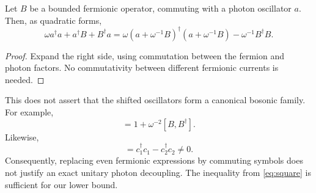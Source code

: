 \begin{lemma}
\label{lem:square}
Let \(B\) be a bounded fermionic operator, commuting with a photon
oscillator \(a\). Then, as quadratic forms,
\begin{equation}
\omega a^\dagger a+a^\dagger B+B^\dagger a
=
\omega\left(a+\omega^{-1}B\right)^\dagger
\left(a+\omega^{-1}B\right)
-\omega^{-1}B^\dagger B.
\label{eq:square}
\end{equation}
\end{lemma}
\begin{proof}
Expand the right side, using commutation between the fermion and photon
factors. No commutativity between different fermionic currents is needed.
\end{proof}
This does not assert that the shifted oscillators form a canonical bosonic
family. For example,
\begin{equation}
[a+\omega^{-1}B,a^\dagger+\omega^{-1}B^\dagger]
=1+\omega^{-2}[B,B^\dagger].
\end{equation}
Likewise,
\begin{equation}
[c_1^\dagger c_2,c_2^\dagger c_1]
=c_1^\dagger c_1-c_2^\dagger c_2\ne0.
\end{equation}
Consequently, replacing even fermionic expressions by commuting symbols
does not justify an exact unitary photon decoupling. The inequality from
\eqref{eq:square} is sufficient for our lower bound.


